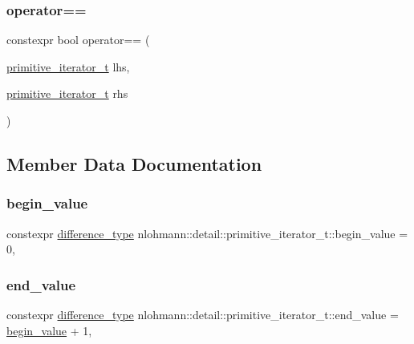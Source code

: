 \subsubsection{\texorpdfstring{operator==}{operator==}}
{\footnotesize\ttfamily constexpr bool operator== (\begin{DoxyParamCaption}\item[{\mbox{\hyperlink{classnlohmann_1_1detail_1_1primitive__iterator__t}{primitive\+\_\+iterator\+\_\+t}}}]{lhs,  }\item[{\mbox{\hyperlink{classnlohmann_1_1detail_1_1primitive__iterator__t}{primitive\+\_\+iterator\+\_\+t}}}]{rhs }\end{DoxyParamCaption})\hspace{0.3cm}{\ttfamily [friend]}}



\subsection{Member Data Documentation}
\mbox{\label{classnlohmann_1_1detail_1_1primitive__iterator__t_afcb3bcf9da8aa95bd82067d1a67c2326}} 
\subsubsection{\texorpdfstring{begin\_value}{begin\_value}}
{\footnotesize\ttfamily constexpr \mbox{\hyperlink{classnlohmann_1_1detail_1_1primitive__iterator__t_af3db0d5c90de427d51645fe73a015553}{difference\+\_\+type}} nlohmann\+::detail\+::primitive\+\_\+iterator\+\_\+t\+::begin\+\_\+value = 0\hspace{0.3cm}{\ttfamily [static]}, {\ttfamily [private]}}

\mbox{\label{classnlohmann_1_1detail_1_1primitive__iterator__t_aa37c37da44f19e6ec1d7d4a9910511c7}} 
\subsubsection{\texorpdfstring{end\_value}{end\_value}}
{\footnotesize\ttfamily constexpr \mbox{\hyperlink{classnlohmann_1_1detail_1_1primitive__iterator__t_af3db0d5c90de427d51645fe73a015553}{difference\+\_\+type}} nlohmann\+::detail\+::primitive\+\_\+iterator\+\_\+t\+::end\+\_\+value = \mbox{\hyperlink{classnlohmann_1_1detail_1_1primitive__iterator__t_afcb3bcf9da8aa95bd82067d1a67c2326}{begin\+\_\+value}} + 1\hspace{0.3cm}{\ttfamily [static]}, {\ttfamily [private]}}

